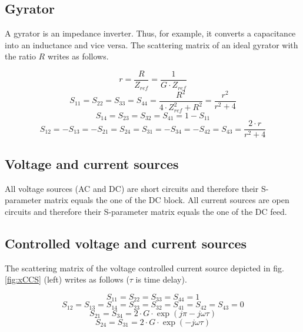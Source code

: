 \documentclass[10pt]{report}
\begin{document}
\subsection{Gyrator}

A gyrator is an impedance inverter.  Thus, for example, it converts a
capacitance into an inductance and vice versa.  The scattering matrix
of an ideal gyrator with the ratio $R$ writes as follows.

\begin{equation}
r = \frac{R}{Z_{ref}} = \frac{1}{G\cdot Z_{ref}}
\end{equation}
\begin{equation}
S_{11} = S_{22} = S_{33} = S_{44} = \frac{R^2}{4\cdot Z_{ref}^2 + R^2} = \frac{r^2}{r^2+4}
\end{equation}
\begin{equation}
S_{14} = S_{23} = S_{32} = S_{41} = 1-S_{11}
\end{equation}
\begin{equation}
S_{12} = -S_{13} = -S_{21} = S_{24} = S_{31} = -S_{34} = -S_{42} = S_{43} = \frac{2\cdot r}{r^2+4}
\end{equation}

\subsection{Voltage and current sources}

All voltage sources (AC and DC) are short circuits and therefore their
S-parameter matrix equals the one of the DC block.  All current
sources are open circuits and therefore their S-parameter matrix
equals the one of the DC feed.

\subsection{Controlled voltage and current sources}

The scattering matrix of the voltage controlled current source
depicted in fig. \ref{fig:xCCS} (left) writes as follows ($\tau$ is
time delay).

\begin{equation}
S_{11} = S_{22} = S_{33} = S_{44} = 1
\end{equation}
\begin{equation}
S_{12} = S_{13} = S_{14} = S_{23} = S_{32} = S_{41} = S_{42} = S_{43} = 0
\end{equation}
\begin{equation}
S_{21} = S_{34} = 2\cdot G\cdot \exp\left(j\pi-j\omega\tau\right)
\end{equation}
\begin{equation}
S_{24} = S_{31} = 2\cdot G\cdot \exp\left(-j\omega\tau\right)
\end{equation}
\end{document}

